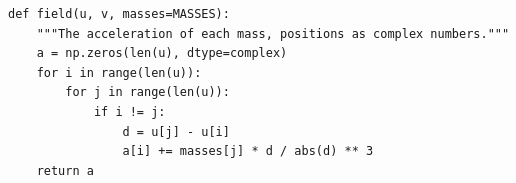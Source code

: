 \begin{verbatim}
def field(u, v, masses=MASSES):
    """The acceleration of each mass, positions as complex numbers."""
    a = np.zeros(len(u), dtype=complex)
    for i in range(len(u)):
        for j in range(len(u)):
            if i != j:
                d = u[j] - u[i]
                a[i] += masses[j] * d / abs(d) ** 3
    return a
\end{verbatim}

